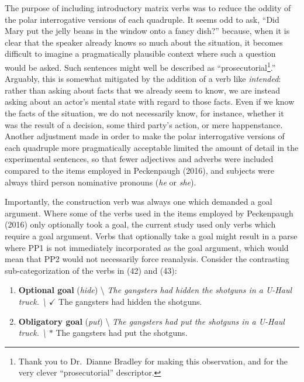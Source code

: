 \documentclass[12pt,oneside]{book}
\let\rmarkdownfootnote\footnote%
\def\footnote{\protect\rmarkdownfootnote}
\begin{document}
The purpose of including introductory matrix verbs  was to reduce the oddity of the polar interrogative versions of each quadruple. It seems odd to ask, ``Did Mary put the jelly beans in the window onto a fancy dish?'' because, when it is clear that the speaker already knows so much about the situation, it becomes difficult to imagine a pragmatically plausible context where such a question would be asked. Such sentences might well be described as ``prosecutorial\footnote{Thank you to Dr.~Dianne Bradley for making this observation, and for the very clever ``prosecutorial'' descriptor.}.'' Arguably, this is somewhat mitigated by the addition of a verb like \emph{intended}: rather than asking about facts that we already seem to know, we are instead asking about an actor's mental state with regard to those facts. Even if we know the facts of the situation, we do not necessarily know, for instance, whether it was the result of a decision, some third party's action, or mere happenstance. Another adjustment made in order to make the polar interrogative versions of each quadruple more pragmatically acceptable limited the amount of detail in the experimental sentences, so that fewer adjectives and adverbs were included compared to the items employed in Peckenpaugh (2016), and subjects were always third person nominative pronouns (\emph{he} or \emph{she}).

Importantly, the construction verb was always one which demanded a goal argument. Where some of the verbs used in the items employed by Peckenpaugh (2016) only optionally took a goal, the current study used only verbs which require a goal argument. Verbs that optionally take a goal  might result in a parse where PP1 is not immediately incorporated as the goal argument, which would mean that PP2 would not necessarily force reanalysis. Consider the contrasting sub-categorization of the verbs in (42) and (43):

\begin{enumerate}
\def\labelenumi{(\arabic{enumi})}
\setcounter{enumi}{41}
\item
  \textbf{Optional goal} (\emph{hide}) \textbackslash{}\emph{
  The gangsters had hidden the shotguns in a U-Haul truck. \textbackslash{}}
  \(\checkmark\) The gangsters had hidden the shotguns.
\item
  \textbf{Obligatory goal} (\emph{put}) \textbackslash{}\emph{
  The gangsters had put the shotguns in a U-Haul truck. \textbackslash{}}
  \(*\) The gangsters had put the shotguns.
\end{enumerate}
\end{document}
